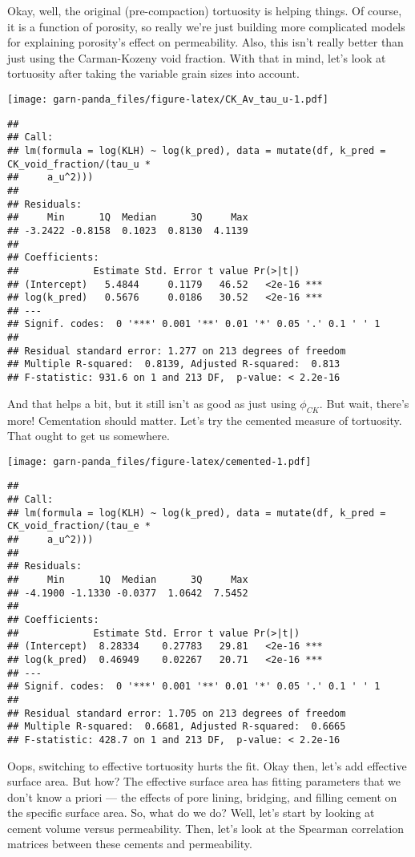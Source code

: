 \documentclass[]{article}
\begin{document}
Okay, well, the original (pre-compaction) tortuosity is helping things.
Of course, it is a function of porosity, so really we're just building
more complicated models for explaining porosity's effect on
permeability. Also, this isn't really better than just using the
Carman-Kozeny void fraction. With that in mind, let's look at tortuosity
after taking the variable grain sizes into account.

\texttt{[image: garn-panda\_files/figure-latex/CK\_Av\_tau\_u-1.pdf]}

\begin{verbatim}
## 
## Call:
## lm(formula = log(KLH) ~ log(k_pred), data = mutate(df, k_pred = CK_void_fraction/(tau_u * 
##     a_u^2)))
## 
## Residuals:
##     Min      1Q  Median      3Q     Max 
## -3.2422 -0.8158  0.1023  0.8130  4.1139 
## 
## Coefficients:
##             Estimate Std. Error t value Pr(>|t|)    
## (Intercept)   5.4844     0.1179   46.52   <2e-16 ***
## log(k_pred)   0.5676     0.0186   30.52   <2e-16 ***
## ---
## Signif. codes:  0 '***' 0.001 '**' 0.01 '*' 0.05 '.' 0.1 ' ' 1
## 
## Residual standard error: 1.277 on 213 degrees of freedom
## Multiple R-squared:  0.8139, Adjusted R-squared:  0.813 
## F-statistic: 931.6 on 1 and 213 DF,  p-value: < 2.2e-16
\end{verbatim}

And that helps a bit, but it still isn't as good as just using
\(\phi_{CK}\). But wait, there's more! Cementation should matter. Let's
try the cemented measure of tortuosity. That ought to get us somewhere.

\texttt{[image: garn-panda\_files/figure-latex/cemented-1.pdf]}

\begin{verbatim}
## 
## Call:
## lm(formula = log(KLH) ~ log(k_pred), data = mutate(df, k_pred = CK_void_fraction/(tau_e * 
##     a_u^2)))
## 
## Residuals:
##     Min      1Q  Median      3Q     Max 
## -4.1900 -1.1330 -0.0377  1.0642  7.5452 
## 
## Coefficients:
##             Estimate Std. Error t value Pr(>|t|)    
## (Intercept)  8.28334    0.27783   29.81   <2e-16 ***
## log(k_pred)  0.46949    0.02267   20.71   <2e-16 ***
## ---
## Signif. codes:  0 '***' 0.001 '**' 0.01 '*' 0.05 '.' 0.1 ' ' 1
## 
## Residual standard error: 1.705 on 213 degrees of freedom
## Multiple R-squared:  0.6681, Adjusted R-squared:  0.6665 
## F-statistic: 428.7 on 1 and 213 DF,  p-value: < 2.2e-16
\end{verbatim}

Oops, switching to effective tortuosity hurts the fit. Okay then, let's
add effective surface area. But how? The effective surface area has
fitting parameters that we don't know a priori --- the effects of pore
lining, bridging, and filling cement on the specific surface area. So,
what do we do? Well, let's start by looking at cement volume versus
permeability. Then, let's look at the Spearman correlation matrices
between these cements and permeability.
\end{document}
